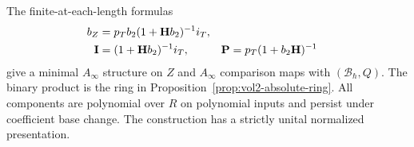 \begin{theorem}\label{thm:vol2-absolute-higher-model}
The finite-at-each-length formulas
\begin{align}\label{eq:vol2-absolute-transfer}
 b_Z&=p_Tb_2(1+\mathbf H b_2)^{-1}i_T,
       \notag\\
 \mathbf I&=(1+\mathbf H b_2)^{-1}i_T,
 &\mathbf P&=p_T(1+b_2\mathbf H)^{-1}
\end{align}
give a minimal $A_\infty$ structure on $Z$ and
$A_\infty$ comparison maps with $(\mathcal B_\hbar,Q)$.
The binary product is the ring in
Proposition~\ref{prop:vol2-absolute-ring}.
All components are polynomial over $R$ on polynomial inputs
and persist under coefficient base change.
The construction has a strictly unital normalized presentation.
\end{theorem}

